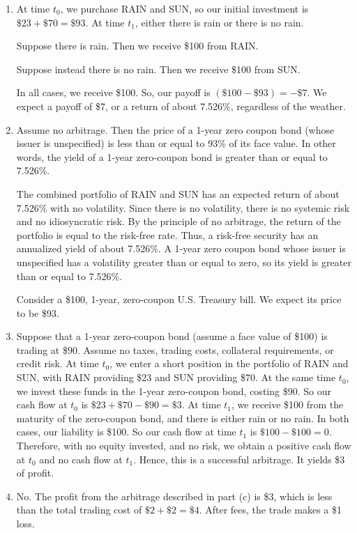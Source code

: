 \documentclass[12pt]{article}
\begin{document}
\begin{enumerate}
\item At time $t_0$, we purchase \textsc{RAIN} and \textsc{SUN}, so our initial investment is $\$23+\$70=\$93$. At time $t_1$, either there is rain or there is no rain.

Suppose there is rain. Then we receive \$100 from \textsc{RAIN}.

Suppose instead there is no rain. Then we receive \$100 from \textsc{SUN}.

In all cases, we receive \$100. So, our payoff is $(\$100-\$93)=-\$7$. We expect a payoff of \$7, or a return of about 7.526\%, regardless of the weather.
\item Assume no arbitrage. Then the price of a 1-year zero coupon bond (whose issuer is unspecified) is less than or equal to 93\% of its face value. In other words, the yield of a 1-year zero-coupon bond is greater than or equal to 7.526\%.

The combined portfolio of \textsc{RAIN} and \textsc{SUN} has an expected return of about 7.526\% with no volatility. Since there is no volatility, there is no systemic risk and no idiosyncratic risk. By the principle of no arbitrage, the return of the portfolio is equal to the risk-free rate. Thus, a risk-free security has an annualized yield of about 7.526\%. A 1-year zero coupon bond whose issuer is unspecified has a volatility greater than or equal to zero, so its yield is greater than or equal to 7.526\%.

Consider a \$100, 1-year, zero-coupon U.S. Treasury bill. We expect its price to be \$93.
\item Suppose that a 1-year zero-coupon bond (assume a face value of \$100) is trading at \$90. Assume no taxes, trading costs, collateral requirements, or credit risk. At time $t_0$, we enter a short position in the portfolio of \textsc{RAIN} and \textsc{SUN}, with \textsc{RAIN} providing \$23 and \textsc{SUN} providing \$70. At the same time $t_0$, we invest these funds in the 1-year zero-coupon bond, costing \$90. So our cash flow at $t_0$ is $\$23+\$70-\$90=\$3$. At time $t_1$, we receive \$100 from the maturity of the zero-coupon bond, and there is either rain or no rain. In both cases, our liability is \$100. So our cash flow at time $t_1$ is $\$100-\$100=0$. Therefore, with no equity invested, and no risk, we obtain a positive cash flow at $t_0$ and no cash flow at $t_1$. Hence, this is a successful arbitrage. It yields \$3 of profit.
\item No. The profit from the arbitrage described in part (c) is \$3, which is less than the total trading cost of $\$2+\$2=\$4$. After fees, the trade makes a \$1 loss.
\end{enumerate}
\end{document}
